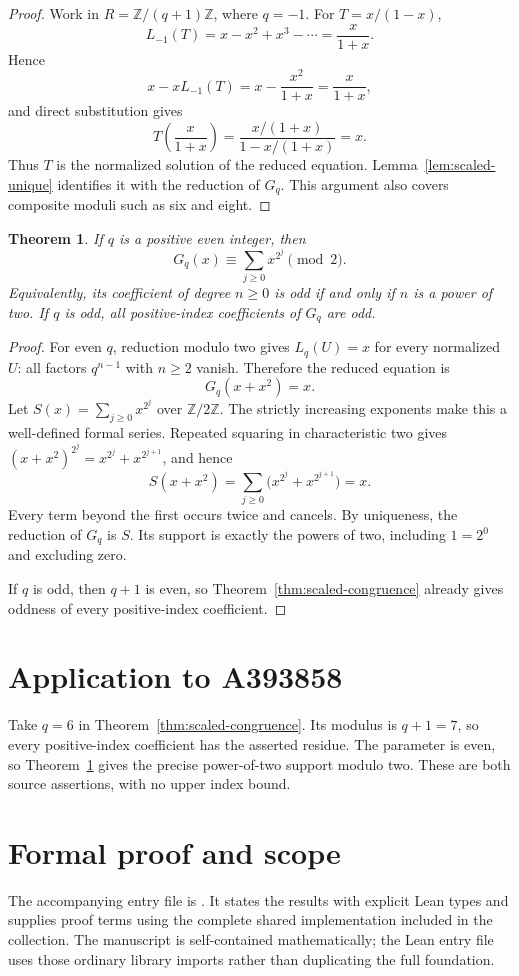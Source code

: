 \documentclass[11pt,a4paper]{article}
\newtheorem{theorem}{Theorem}[section]
\theoremstyle{remark}\newtheorem{remark}[theorem]{Remark}
\newcommand{\Z}{\mathbb Z}
\begin{document}
\begin{proof}
Work in $R=\Z/(q+1)\Z$, where $q=-1$. For $T=x/(1-x)$,
\[
L_{-1}(T)=x-x^2+x^3-\cdots=\frac{x}{1+x}.
\]
Hence
\[
x-xL_{-1}(T)=x-\frac{x^2}{1+x}=\frac{x}{1+x},
\]
and direct substitution gives
\[
T\left(\frac{x}{1+x}\right)
=\frac{x/(1+x)}{1-x/(1+x)}=x.
\]
Thus $T$ is the normalized solution of the reduced equation.
Lemma~\ref{lem:scaled-unique} identifies it with the reduction of
$G_q$. This argument also covers composite moduli such as six
and eight.
\end{proof}

\begin{theorem}\label{thm:scaled-parity}
If $q$ is a positive even integer, then
\[
G_q(x)\equiv\sum_{j\ge0}x^{2^j}\pmod2.
\]
Equivalently, its coefficient of degree $n\ge0$ is odd if and only
if $n$ is a power of two. If $q$ is odd, all positive-index
coefficients of $G_q$ are odd.
\end{theorem}

\begin{proof}
For even $q$, reduction modulo two gives $L_q(U)=x$ for every
normalized $U$: all factors $q^{n-1}$ with $n\ge2$ vanish.
Therefore the reduced equation is
\[
G_q(x+x^2)=x.
\]
Let $S(x)=\sum_{j\ge0}x^{2^j}$ over $\Z/2\Z$.
The strictly increasing exponents make this a well-defined formal
series. Repeated squaring in characteristic two gives
$(x+x^2)^{2^j}=x^{2^j}+x^{2^{j+1}}$, and hence
\[
S(x+x^2)
=\sum_{j\ge0}\bigl(x^{2^j}+x^{2^{j+1}}\bigr)=x.
\]
Every term beyond the first occurs twice and cancels. By uniqueness,
the reduction of $G_q$ is $S$. Its support is exactly the powers
of two, including $1=2^0$ and excluding zero.

If $q$ is odd, then $q+1$ is even, so
Theorem~\ref{thm:scaled-congruence} already gives oddness of every
positive-index coefficient.
\end{proof}


\section{Application to A393858}
Take $q=6$ in Theorem~\ref{thm:scaled-congruence}.
Its modulus is $q+1=7$, so every positive-index
coefficient has the asserted residue. The parameter is even, so Theorem~\ref{thm:scaled-parity}
gives the precise power-of-two support modulo two. These are both
source assertions, with no upper index bound.

\section{Formal proof and scope}
The accompanying entry file is .
It states the results with explicit Lean types and supplies proof terms
using the complete shared implementation included in the collection.
The manuscript is self-contained mathematically; the Lean entry file uses
those ordinary library imports rather than duplicating the full foundation.
\end{document}
